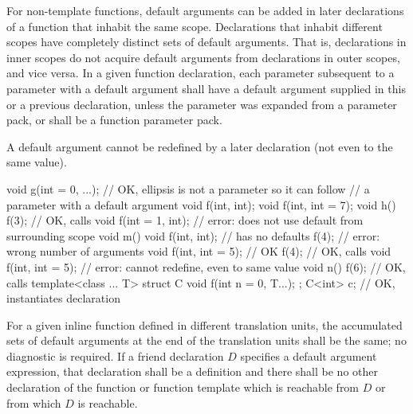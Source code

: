 \pnum
For non-template functions, default arguments can be added in later
declarations of a
function that inhabit the same scope.
Declarations that inhabit different
scopes have completely distinct sets of default arguments.
That
is, declarations in inner scopes do not acquire default
arguments from declarations in outer scopes, and vice versa.
In
a given function declaration, each parameter subsequent to a
parameter with a default argument shall have a default argument
supplied in this or a previous declaration,
unless the parameter was expanded from a parameter pack,
or shall be a function parameter pack.
\begin{note}
A default argument
cannot be redefined by a later declaration
(not even to the same value).
\end{note}
\begin{example}
\begin{codeblock}
void g(int = 0, ...);           // OK, ellipsis is not a parameter so it can follow
                                // a parameter with a default argument
void f(int, int);
void f(int, int = 7);
void h() {
  f(3);                         // OK, calls 
  void f(int = 1, int);         // error: does not use default from surrounding scope
}
void m() {
  void f(int, int);             // has no defaults
  f(4);                         // error: wrong number of arguments
  void f(int, int = 5);         // OK
  f(4);                         // OK, calls 
  void f(int, int = 5);         // error: cannot redefine, even to same value
}
void n() {
  f(6);                         // OK, calls 
}
template<class ... T> struct C {
  void f(int n = 0, T...);
};
C<int> c;                       // OK, instantiates declaration 
\end{codeblock}
\end{example}
For a given inline function defined in different translation units,
the accumulated sets of default arguments at the end of the
translation units shall be the same; no diagnostic is required.
If a friend declaration $D$ specifies a default argument expression,
that declaration shall be a definition and there shall be no other
declaration of the function or function template
which is reachable from $D$ or from which $D$ is reachable.

